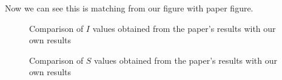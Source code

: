 \documentclass[10pt]{article}
\begin{document}
Now we can see this is matching from our figure with paper figure.


\begin{figure}[!htbp]
  \centering
  \hfill
  \label{fig:RK4_41}
  \caption{Comparison of \(I\) values obtained from the paper's results with our own results  }
\end{figure}
\begin{figure}[!htbp]
  \centering
  \hfill
  \caption{Comparison of \(S\) values obtained from the paper's results with our own results  }
\end{figure}
\newpage
\end{document}
